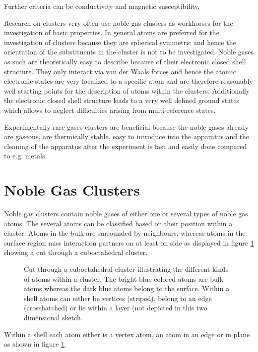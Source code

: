 Further criteria can be conductivity and magnetic susceptibility.

Research on clusters very often use noble gas clusters as workhorses for
the investigation of basic properties.
In general atoms are preferred for the investigation of clusters because
they are spherical symmetric and hence the orientation of the substituents
in the cluster is not to be investigated.
Noble gases as such are theoretically easy to describe because of their
electronic closed shell structure.
They only interact via
van der Waals forces and hence the atomic electronic states are very
localized to a specific atom and are therefore
reasonably well starting points for the description of atoms within the
clusters. 
Additionally the electronic closed shell structure leads to a very well
defined ground states which allows to neglect difficulties arising from
multi-reference states.

Experimentally rare gases clusters are beneficial because the noble gases
already are gaseous, are
thermically stable, easy to introduce into the apparatus
and the cleaning of the
apparatus after the experiment is fast and easily done compared to
e.g. metals.


\section{Noble Gas Clusters}
Noble gas clusters contain noble gases of either one or several types of
noble gas atoms. The several atoms can be classified based on
their position within a cluster. Atoms in the bulk are surrounded by
neighbours, whereas atoms in the surface region miss interaction
partners on at least on side as displayed in figure \ref{figure:cluster_cut} showing
a cut through a cuboctahedral cluster.

\begin{figure}[h]
 \centering
 
 \caption{Cut through a cuboctahedral cluster illustrating the different
          kinds of atoms within a cluster. The bright blue colored atoms
          are bulk atoms whereas the dark blue atoms belong to the surface.
          Within a shell atoms can either be vertices (striped), belong to
          an edge (crosshatched) or lie within a layer (not depicted in this
          two dimensional sketch.}
 \label{figure:cluster_cut}
\end{figure}

Within a shell each atom either is a vertex atom, an atom in an edge
or in plane as shown in figure \ref{figure:cluster_cut}.

